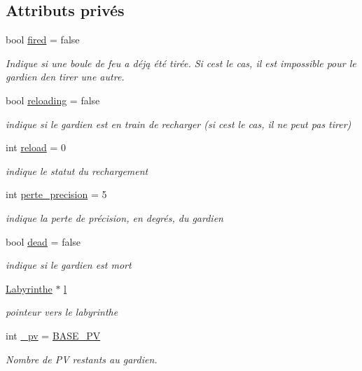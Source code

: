 \subsection*{Attributs privés}
\begin{DoxyCompactItemize}
\item 
bool \hyperlink{classGardien_a8ca3f9b553e9248f36735dde604fd756}{fired} = false
\begin{DoxyCompactList}\small\item\em Indique si une boule de feu a déją été tirée. Si c\textquotesingle{}est le cas, il est impossible pour le gardien d\textquotesingle{}en tirer une autre. \end{DoxyCompactList}\item 
bool \hyperlink{classGardien_aabac0fd95b26fdafba349c911542311a}{reloading} = false
\begin{DoxyCompactList}\small\item\em indique si le gardien est en train de recharger (si c\textquotesingle{}est le cas, il ne peut pas tirer) \end{DoxyCompactList}\item 
int \hyperlink{classGardien_a58cdd1f05ebd54e3f638b69e4978837d}{reload} = 0
\begin{DoxyCompactList}\small\item\em indique le statut du rechargement \end{DoxyCompactList}\item 
int \hyperlink{classGardien_a5d7e6815e221a4c2038efaf6e8ba9d2e}{perte\+\_\+precision} = 5
\begin{DoxyCompactList}\small\item\em indique la perte de précision, en degrés, du gardien \end{DoxyCompactList}\item 
bool \hyperlink{classGardien_ad418641d97373fb9304fc76f78c817ac}{dead} = false
\begin{DoxyCompactList}\small\item\em indique si le gardien est mort \end{DoxyCompactList}\item 
\hyperlink{classLabyrinthe}{Labyrinthe} $\ast$ \hyperlink{classGardien_a6a2c6e6cba4cf4e760ee8509d72f0f98}{l}
\begin{DoxyCompactList}\small\item\em pointeur vers le labyrinthe \end{DoxyCompactList}\item 
int \hyperlink{classGardien_a252683c50522c13f9604bea387d1af34}{\+\_\+pv} = \hyperlink{classGardien_a1832c02b32c6e47b240536fd6ba47812}{B\+A\+S\+E\+\_\+\+PV}
\begin{DoxyCompactList}\small\item\em Nombre de PV restants au gardien. \end{DoxyCompactList}\end{DoxyCompactItemize}
